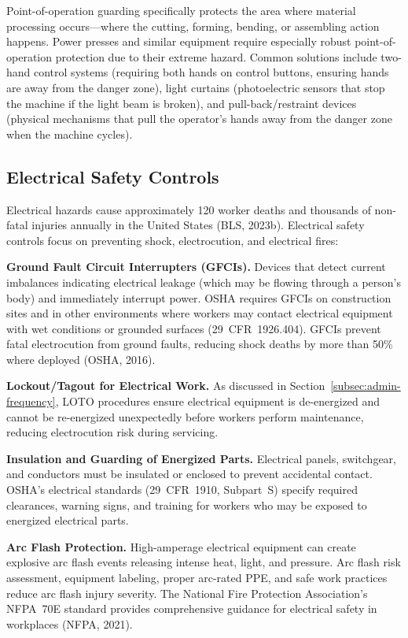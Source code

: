 \documentclass[11pt,openany]{book}
\begin{document}
Point-of-operation guarding specifically protects the area where material
processing occurs---where the cutting, forming, bending, or assembling action
happens. Power presses and similar equipment require especially robust
point-of-operation protection due to their extreme hazard. Common solutions
include two-hand control systems (requiring both hands on control buttons,
ensuring hands are away from the danger zone), light curtains (photoelectric
sensors that stop the machine if the light beam is broken), and
pull-back/restraint devices (physical mechanisms that pull the operator's
hands away from the danger zone when the machine cycles).

\subsection{Electrical Safety Controls}

Electrical hazards cause approximately 120 worker deaths and thousands of
non-fatal injuries annually in the United States (BLS, 2023b). Electrical
safety controls focus on preventing shock, electrocution, and electrical
fires:

\textbf{Ground Fault Circuit Interrupters (GFCIs).} Devices that detect
current imbalances indicating electrical leakage (which may be flowing through
a person's body) and immediately interrupt power. OSHA requires GFCIs on
construction sites and in other environments where workers may contact
electrical equipment with wet conditions or grounded surfaces
(29~CFR~1926.404). GFCIs prevent fatal electrocution from ground faults,
reducing shock deaths by more than 50\% where deployed (OSHA, 2016).

\textbf{Lockout/Tagout for Electrical Work.} As discussed in
Section~\ref{subsec:admin-frequency}, LOTO procedures ensure electrical
equipment is de-energized and cannot be re-energized unexpectedly before
workers perform maintenance, reducing electrocution risk during servicing.

\textbf{Insulation and Guarding of Energized Parts.} Electrical panels,
switchgear, and conductors must be insulated or enclosed to prevent accidental
contact. OSHA's electrical standards (29~CFR~1910, Subpart~S) specify required
clearances, warning signs, and training for workers who may be exposed to
energized electrical parts.

\textbf{Arc Flash Protection.} High-amperage electrical equipment can create
explosive arc flash events releasing intense heat, light, and pressure. Arc
flash risk assessment, equipment labeling, proper arc-rated PPE, and safe work
practices reduce arc flash injury severity. The National Fire Protection
Association's NFPA~70E standard provides comprehensive guidance for electrical
safety in workplaces (NFPA, 2021).
\end{document}
